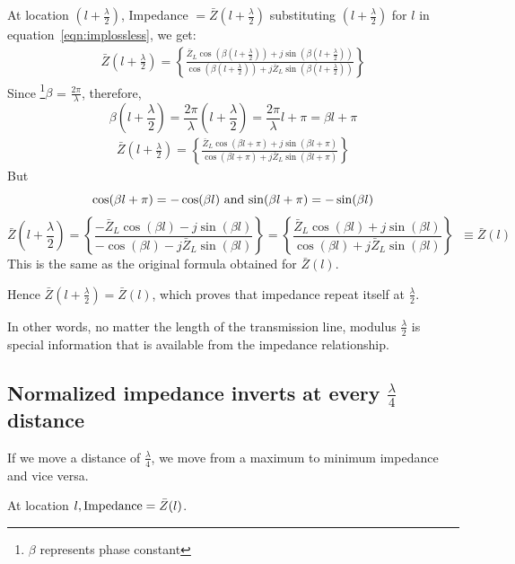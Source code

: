 At location ${\left(l+\frac{\lambda}{2}\right)}$, Impedance $= \bar{Z}\left(l+\frac{\lambda}{2}\right)$ substituting ${\left(l+\frac{\lambda}{2}\right)}$ for $l$ in equation~\eqref{eqn:implossless}, we get: 
\begin{align*}
\bar{Z}\left(l+\frac{\lambda}{2}\right) = \left\lbrace \frac{\bar{Z}_L \cos(\beta \left(l+\frac{\lambda}{2}\right)) + j\sin(\beta \left(l+\frac{\lambda}{2}\right))}{\cos(\beta \left(l+\frac{\lambda}{2}\right)) + j\bar{Z}_L \sin(\beta \left(l+\frac{\lambda}{2}\right))}\right\rbrace 
\end{align*}
Since \footnote{$\beta$ represents phase constant}$\beta$ = $ \frac{2\pi}{\lambda}$, therefore,
\begin{dmath*}
\beta\left(l+\frac{\lambda}{2}\right)=\frac{2\pi}{\lambda}\left(l+\frac{\lambda}{2}\right)=\frac{2\pi}{\lambda}l+\pi=\beta l+\pi
\end{dmath*}
\begin{align*}
\bar{Z}\left(l+\frac{\lambda}{2}\right) = \left\lbrace \frac{\bar{Z}_L\cos(\beta l+\pi) + j\sin(\beta l+\pi)}{\cos(\beta l+\pi) + j\bar{Z}_L\sin(\beta l+\pi)}\right\rbrace 
\end{align*}
But 
\[
\cos(\beta l+\pi)=-\cos(\beta l)$ and $\sin(\beta l+\pi)=-\sin(\beta l)
\] 
\begin{dmath*}
\bar{Z}\left(l+\frac{\lambda}{2}\right)=\left\lbrace \frac{-\bar{Z}_L \cos(\beta l) - j\sin(\beta l)}{-\cos(\beta l) - j\bar{Z}_L \sin(\beta l)}\right\rbrace = \left\lbrace \frac{\bar{Z}_L \cos(\beta l) + j\sin(\beta l)}{\cos(\beta l) + j\bar{Z}_L \sin(\beta l)}\right\rbrace\;\;\equiv\bar{Z}(l)
\end{dmath*} 
This is the same as the original formula obtained for $\bar{Z}(l)$.

Hence $\bar{Z}\left(l+\frac{\lambda}{2}\right)=\bar{Z}(l)$, which proves that impedance repeat itself at $\frac{\lambda}{2}$.

In other words, no matter the length of the transmission line, modulus $\frac{\lambda}{2}$ is special information that is available from the impedance relationship.

\subsection{Normalized impedance inverts at every $\frac{\lambda}{4}$ distance}
If we move a distance of $\frac{\lambda}{4}$, we move from a maximum to minimum impedance and vice versa.

At location $l, \textnormal{Impedance}=\bar{Z}(l)$.

